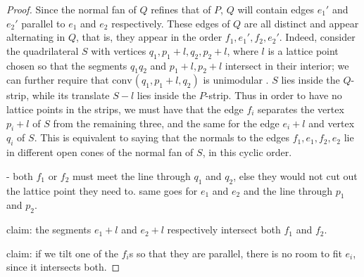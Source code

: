 \documentclass{amsart}
\theoremstyle{plain}
\theoremstyle{definition}
\newcommand{\conv}{\ensuremath{\mathrm{conv}}\hspace{1pt}}
\newcommand{\giulia}[1]{\todo[size=\tiny,color=blue!30]{#1 \\ \hfill --- G.}}
\begin{document}
\begin{proof}
Since the normal fan of $Q$ refines that of $P$, $Q$ will contain edges $e_1'$ and $e_2'$ parallel to $e_1$ and $e_2$ respectively. These edges of $Q$ are all distinct and appear alternating in $Q$, that is, they appear in the order $f_1, e_1', f_2, e_2'$. Indeed, consider the quadrilateral $S$ with vertices $q_1, p_1+l, q_2, p_2+l$, where $l$ is a lattice point chosen so that the segments $q_1q_2$ and $p_1+l,p_2+l$ intersect in their interior; we can further require that $\conv( q_1, p_1+l, q_2)$ is unimodular \giulia{not sure if we use it}. $S$ lies inside the $Q$-strip, while its translate $S-l$ lies inside the $P$-strip. Thus in order to have no lattice points in the strips, we must have that the edge $f_i$ separates the vertex $p_i +l$ of $S$ from the remaining three, and  the same for the edge $e_i +l$ and vertex $q_i$ of $S$. This is equivalent to saying that the normals to the edges $f_1, e_1, f_2, e_2$ lie in different open cones of the normal fan of $S$, in this cyclic order. 

- both $f_1$ or $f_2$ must meet the line through $q_1$ and $q_2$, else they would not cut out the lattice point they need to. same goes for $e_1$ and $e_2$ and the line through $p_1$ and $p_2$.

claim: the segments $e_1 + l$ and $e_2 + l$ respectively intersect both $f_1$ and $f_2$. 

claim: if we tilt one of the $f_i$s so that they are parallel, there is no room to fit $e_i$, since it intersects both. 






\end{proof}
\end{document}
